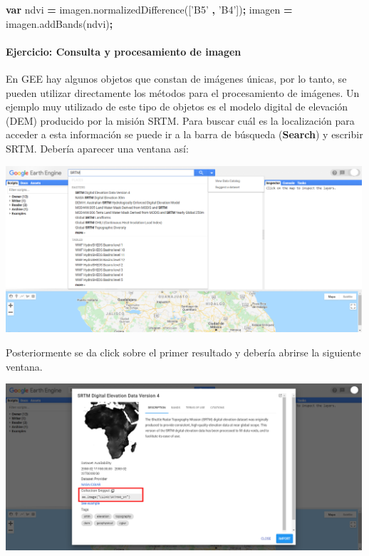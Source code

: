 \documentclass[
]{article}
\newenvironment{Shaded}{\begin{snugshade}}{\end{snugshade}}
\newcommand{\AttributeTok}[1]{\textcolor[rgb]{0.77,0.63,0.00}{#1}}
\newcommand{\KeywordTok}[1]{\textcolor[rgb]{0.13,0.29,0.53}{\textbf{#1}}}
\newcommand{\NormalTok}[1]{#1}
\newcommand{\OperatorTok}[1]{\textcolor[rgb]{0.81,0.36,0.00}{\textbf{#1}}}
\newcommand{\StringTok}[1]{\textcolor[rgb]{0.31,0.60,0.02}{#1}}
\newcommand{\VariableTok}[1]{\textcolor[rgb]{0.00,0.00,0.00}{#1}}
\begin{document}
\begin{Shaded}
\begin{Highlighting}[]
\KeywordTok{var}\NormalTok{ ndvi }\OperatorTok{=} \VariableTok{imagen}\NormalTok{.}\AttributeTok{normalizedDifference}\NormalTok{([}\StringTok{'B5'} \OperatorTok{,} \StringTok{'B4'}\NormalTok{])}\OperatorTok{;}
\NormalTok{imagen }\OperatorTok{=} \VariableTok{imagen}\NormalTok{.}\AttributeTok{addBands}\NormalTok{(ndvi)}\OperatorTok{;}
\end{Highlighting}
\end{Shaded}

\hypertarget{ejercicio-consulta-y-procesamiento-de-imagen}{%
\paragraph{Ejercicio: Consulta y procesamiento de
imagen}\label{ejercicio-consulta-y-procesamiento-de-imagen}}

En GEE hay algunos objetos que constan de imágenes únicas, por lo tanto,
se pueden utilizar directamente los métodos para el procesamiento de
imágenes. Un ejemplo muy utilizado de este tipo de objetos es el modelo
digital de elevación (DEM) producido por la misión SRTM. Para buscar
cuál es la localización para acceder a esta información se puede ir a la
barra de búsqueda (\textbf{Search}) y escribir SRTM. Debería aparecer
una ventana así:

\includegraphics[width=500px]{Img/SRTM}

Posteriormente se da click sobre el primer resultado y debería abrirse
la siguiente ventana.

\includegraphics[width=500px]{Img/SRTM_prop}
\end{document}
